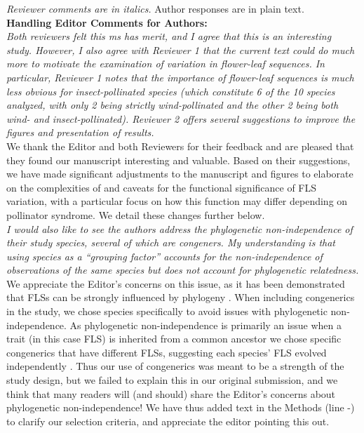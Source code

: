 \documentclass[11pt]{article}
\begin{document}
\emph{Reviewer comments are in italics.} Author responses are in plain text.\\

\textbf{Handling Editor Comments for Authors:}\\

\emph{Both reviewers felt this ms has merit, and I agree that this is an interesting study. However, I also agree with Reviewer 1 that the current text could do much more to motivate the examination of variation in flower-leaf sequences. In particular, Reviewer 1 notes that the importance of flower-leaf sequences is much less obvious for insect-pollinated species (which constitute 6 of the 10 species analyzed, with only 2 being strictly wind-pollinated and the other 2 being both wind- and insect-pollinated). Reviewer 2 offers several suggestions to improve the figures and presentation of results.}\\

\noindent We thank the Editor and both Reviewers for their feedback and are pleased that they found our manuscript interesting and valuable. Based on their suggestions, we have made significant adjustments to the manuscript and figures to elaborate on the complexities of and caveats for the functional significance of FLS variation, with a particular focus on how this function may differ depending on pollinator syndrome. We detail these changes further below.\\

\emph{I would also like to see the authors address the phylogenetic non-independence of their study species, several of which are congeners. My understanding is that using species as a ``grouping factor'' accounts for the non-independence of observations of the same species but does not account for phylogenetic relatedness.}\\

\noindent We appreciate the Editor's concerns on this issue, as it has been demonstrated that FLSs can be strongly influenced by phylogeny \citep{Buonaiuto2020,Gougherty2018}. When including congenerics in the study, we chose species specifically to avoid issues with phylogenetic non-independence. As phylogenetic non-independence is primarily an issue when a trait (in this case FLS) is inherited from a common ancestor we chose specific congenerics that have different FLSs, suggesting each species' FLS evolved independently \citep{Revell:2010aa}. Thus our use of congenerics was meant to be a strength of the study design, but we failed to explain this in our original submission, and we think that many readers will (and should) share the Editor's concerns about phylogenetic non-independence! We have thus added text in the Methods (line -) to clarify our selection criteria, and appreciate the editor pointing this out.\\ 
\end{document}
